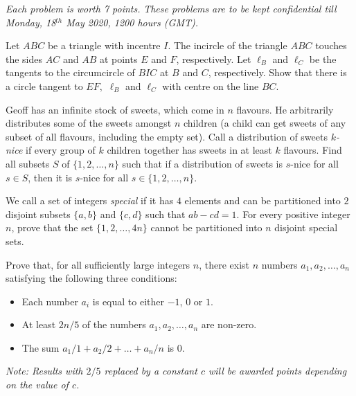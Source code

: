 \documentclass{qmo}
\date{May 16th, 2020}
\begin{document}
\maketitle
\begin{flushright}
\emph{Each problem is worth 7 points.}\nl
\emph{These problems are to be kept confidential till Monday, 18$^\mathit{th}$ May 2020, 1200 hours (GMT).}
\end{flushright}
\begin{problem}
	Let $ABC$ be a triangle with incentre $I$. The incircle of the triangle $ABC$ touches the sides $AC$ and $AB$ at points $E$ and $F$, respectively. Let $\ell_B$ and  $\ell_C$ be the tangents to the circumcircle of $BIC$ at $B$ and $C$, respectively. Show that there is a circle tangent to $EF,$ $\ell_B$ and $\ell_C$ with centre on the line $BC$.
\end{problem}

\begin{problem}
	Geoff has an infinite stock of sweets, which come in $n$ flavours. He arbitrarily distributes some of the sweets amongst $n$ children (a child can get sweets of any subset of all flavours, including the empty set). Call a distribution of sweets $k$\emph{-nice} if every group of $k$ children together has sweets in at least $k$ flavours. Find all subsets $S$ of $\{1,2,\dots,n\}$ such that if a distribution of sweets is $s$-nice for all $s\in S$, then it is $s$-nice for all $s\in \{1,2,\dots,n\}$.
\end{problem}

\begin{problem}
	We call a set of integers \textit{special} if it has $4$ elements and can be partitioned into $2$ disjoint subsets $\{a,b\}$ and $\{c,d\}$ such that $ab-cd=1$. For every positive integer $n$, prove that the set $\{1,2, \ldots , 4n\}$ cannot be partitioned into $n$ disjoint special sets.
\end{problem}

\begin{problem}
	Prove that, for all sufficiently large integers $n$, there exist $n$ numbers $a_1,a_2,\ldots,a_n$ satisfying the following three conditions:
	\begin{itemize}
	\item Each number $a_i$ is equal to either $-1$, $0$ or $1$.
	\item At least $2n/5$ of the numbers  $a_1,a_2,\ldots, a_n$ are non-zero.
	\item The sum $a_1/1+a_2/2+\ldots+a_n/n$ is $0$.
	\end{itemize}
	\emph{Note: Results with $2/5$ replaced by a constant $c$ will be awarded points depending on the value of $c$.}
\end{problem}
\end{document}
